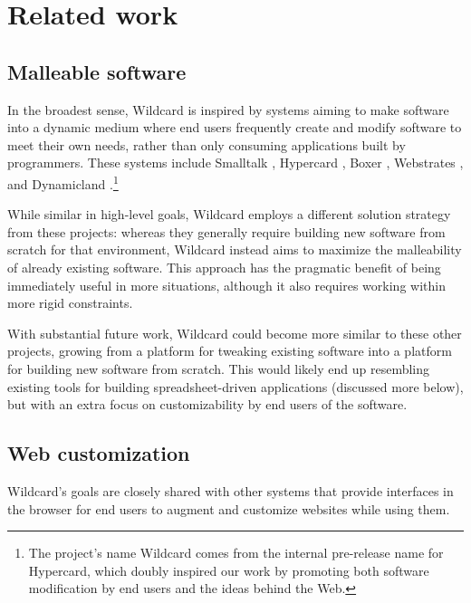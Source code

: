 \documentclass[english,submission]{programming}
\begin{document}
\hypertarget{related-work}{%
\section{Related work}\label{related-work}}

\hypertarget{malleable-software}{%
\subsection{Malleable software}\label{malleable-software}}

In the broadest sense, Wildcard is inspired by systems aiming to make
software into a dynamic medium where end users frequently create and
modify software to meet their own needs, rather than only consuming
applications built by programmers. These systems include Smalltalk
\autocite{kay1977}, Hypercard \autocite{hypercard2019} , Boxer
\autocite{disessa1986}, Webstrates \autocite{klokmose2015}, and
Dynamicland \autocite{victor}.\footnote{The project's name Wildcard
  comes from the internal pre-release name for Hypercard, which doubly
  inspired our work by promoting both software modification by end users
  and the ideas behind the Web.}

While similar in high-level goals, Wildcard employs a different solution
strategy from these projects: whereas they generally require building
new software from scratch for that environment, Wildcard instead aims to
maximize the malleability of already existing software. This approach
has the pragmatic benefit of being immediately useful in more
situations, although it also requires working within more rigid
constraints.

With substantial future work, Wildcard could become more similar to
these other projects, growing from a platform for tweaking existing
software into a platform for building new software from scratch. This
would likely end up resembling existing tools for building
spreadsheet-driven applications (discussed more below), but with an
extra focus on customizability by end users of the software.

\hypertarget{web-customization}{%
\subsection{Web customization}\label{web-customization}}

Wildcard's goals are closely shared with other systems that provide
interfaces in the browser for end users to augment and customize
websites while using them.
\end{document}
